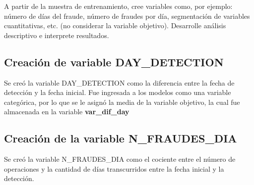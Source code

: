 \documentclass[
	11pt, %
	spanish, %
]{fphw}
\begin{document}
\begin{problem}
A partir de la muestra de entrenamiento, cree variables como, por ejemplo: número de días del fraude, número de fraudes por día, segmentación de variables cuantitativas, etc. (no considerar la variable objetivo). Desarrolle análisis descriptivo e interprete resultados.
\end{problem}











\subsection*{Creación de variable DAY\_DETECTION}
Se creó la variable DAY\_DETECTION como la diferencia entre la fecha de detección y la fecha inicial. Fue ingresada a los modelos como una variable categórica, por lo que se le asignó la media de la variable objetivo, la cual fue almacenada en la variable \textbf{var\_dif\_day}

\subsection*{Creación de la variable N\_FRAUDES\_DIA}
Se creó la variable N\_FRAUDES\_DIA como el cociente entre el número de operaciones y la cantidad de días transcurridos entre la fecha inicial y la detección.
\end{document}
